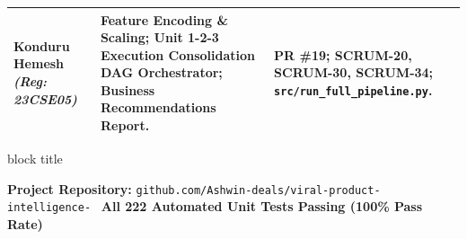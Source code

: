 \documentclass[aspectratio=169, 10pt]{beamer}
\newenvironment{highlightcard}[1][]{%
        \begin{beamercolorbox}[rounded=true,shadow=false,wd=\linewidth,sep=3.5pt,#1]{block title}%
        \fontsize{7.8pt}{9.8pt}\selectfont%
    }{%
        \end{beamercolorbox}%
    }
\begin{document}
\begin{frame}[t]
\begin{table}[h]
\begin{tabular}{p{3.2cm}p{5.8cm}p{4.0cm}}
                \textbf{Konduru Hemesh} \newline \textit{(Reg: 23CSE05)} & Feature Encoding \& Scaling; Unit 1-2-3 Execution Consolidation DAG Orchestrator; Business Recommendations Report. & PR \#19;
  SCRUM-20, SCRUM-30, SCRUM-34; \texttt{src/run\_full\_pipeline.py}. \\                                                                                                                                
                \bottomrule                                                                                                                                                                            
            \end{tabular}                                                                                                                                                                              
        \end{table}                                                                                                                                                                                    
        \vspace{-0.15cm}                                                                                                                                                                               
        \begin{highlightcard}                                                                                                                                                                          
            \centering\scriptsize                                                                                                                                                                      
            \textbf{Project Repository:} \texttt{github.com/Ashwin-deals/viral-product-intelligence-} \textbullet\ \textbf{All 222 Automated Unit Tests Passing (100\% Pass Rate)}                     
        \end{highlightcard}                                                                                                                                                                            
    \end{frame}                                                                                                                                                                                        
                                                                                                                                                                                                       
\end{document}
